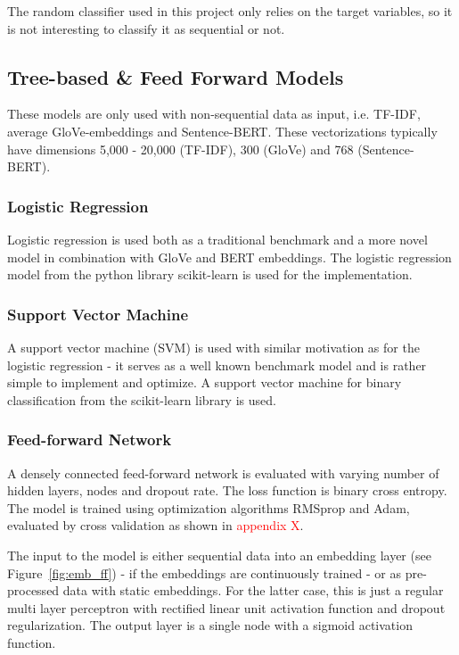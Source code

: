 The random classifier used in this project only relies on the target variables, so it is not interesting to classify it as sequential or not.  

\subsection{Tree-based \& Feed Forward Models}

These models are only used with non-sequential data as input, i.e. TF-IDF, average GloVe-embeddings and Sentence-BERT. These vectorizations typically have dimensions 5,000 - 20,000 (TF-IDF), 300 (GloVe) and 768 (Sentence-BERT). 


\subsubsection*{Logistic Regression}

Logistic regression is used both as a traditional benchmark and a more novel model in combination with GloVe and BERT embeddings. The logistic regression model from the python library scikit-learn is used for the implementation.

\subsubsection*{Support Vector Machine}

A support vector machine (SVM) is used with similar motivation as for the logistic regression - it serves as a well known benchmark model and is rather simple to implement and optimize.  A support vector machine for binary classification from the scikit-learn library is used. 

\subsubsection*{Feed-forward Network}

A densely connected feed-forward network is evaluated with varying number of hidden layers, nodes and dropout rate. The loss function is binary cross entropy. The model is trained using optimization algorithms RMSprop and Adam, evaluated by cross validation as shown in \textcolor{red}{appendix X}.

The input to the model is either sequential data into an embedding layer (see Figure~\ref{fig:emb_ff}) - if the embeddings are continuously trained - or as pre-processed data with static embeddings. For the latter case, this is just a regular multi layer perceptron with rectified linear unit activation function and dropout regularization. The output layer is a single node with a sigmoid activation function.


